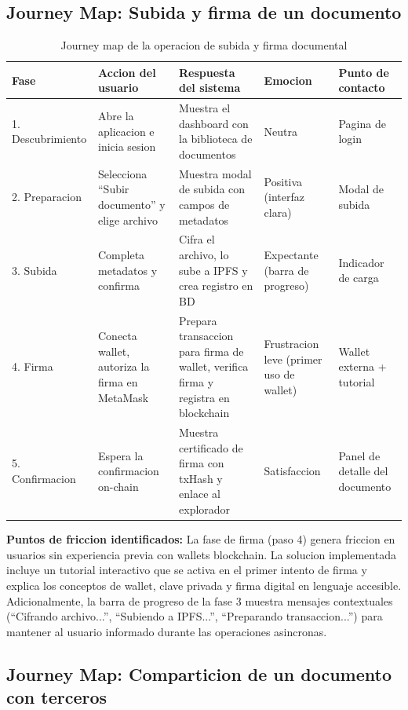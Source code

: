 \documentclass[11pt, a4paper]{article}
\begin{document}
\subsection{Journey Map: Subida y firma de un documento}

\begin{table}[H]
\centering
\renewcommand{\arraystretch}{1.6}
\small
\begin{tabular}{|p{2.2cm}|p{2.8cm}|p{2.8cm}|p{2.2cm}|p{2.2cm}|}
\hline
\textbf{Fase} & \textbf{Accion del usuario} & \textbf{Respuesta del sistema} & \textbf{Emocion} & \textbf{Punto de contacto} \\
\hline
1. Descubrimiento & Abre la aplicacion e inicia sesion & Muestra el dashboard con la biblioteca de documentos & Neutra & Pagina de login \\
\hline
2. Preparacion & Selecciona ``Subir documento'' y elige archivo & Muestra modal de subida con campos de metadatos & Positiva (interfaz clara) & Modal de subida \\
\hline
3. Subida & Completa metadatos y confirma & Cifra el archivo, lo sube a IPFS y crea registro en BD & Expectante (barra de progreso) & Indicador de carga \\
\hline
4. Firma & Conecta wallet, autoriza la firma en MetaMask & Prepara transaccion para firma de wallet, verifica firma y registra en blockchain & Frustracion leve (primer uso de wallet) & Wallet externa + tutorial \\
\hline
5. Confirmacion & Espera la confirmacion on-chain & Muestra certificado de firma con txHash y enlace al explorador & Satisfaccion & Panel de detalle del documento \\
\hline
\end{tabular}
\caption{Journey map de la operacion de subida y firma documental}
\label{tab:journey-subida}
\end{table}

\textbf{Puntos de friccion identificados:} La fase de firma (paso 4) genera friccion en usuarios sin experiencia previa con wallets blockchain. La solucion implementada incluye un tutorial interactivo que se activa en el primer intento de firma y explica los conceptos de wallet, clave privada y firma digital en lenguaje accesible. Adicionalmente, la barra de progreso de la fase 3 muestra mensajes contextuales (``Cifrando archivo...'', ``Subiendo a IPFS...'', ``Preparando transaccion...'') para mantener al usuario informado durante las operaciones asincronas.

\subsection{Journey Map: Comparticion de un documento con terceros}
\end{document}
